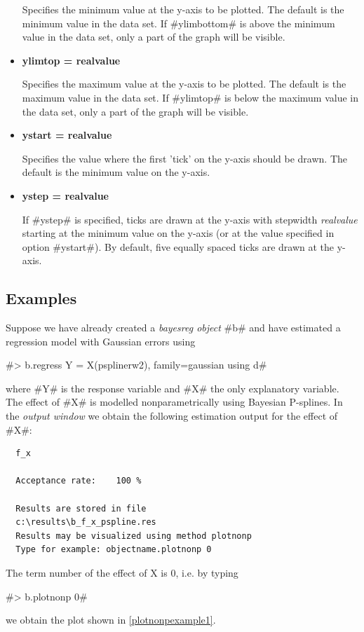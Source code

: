 \begin{itemize}
Specifies the minimum value at the y-axis to be plotted. The
default is the minimum value in the data set. If #ylimbottom# is
above the minimum value in the data set, only a part of the graph
will be visible.
\item {\bf ylimtop = realvalue}

Specifies the maximum value at the y-axis to be plotted. The
default is the maximum value in the data set. If #ylimtop# is
below the maximum value in the data set, only a part of the graph
will be visible.
\item {\bf ystart = realvalue}

Specifies the value where the first 'tick' on the y-axis should be
drawn. The default is the minimum value on the y-axis.
\item {\bf ystep = realvalue}

If #ystep# is specified,  ticks are drawn at the y-axis with
stepwidth {\em realvalue} starting at the minimum value on the
y-axis (or at the value specified in option #ystart#). By default,
five equally spaced ticks are drawn at the y-axis.
\end{itemize}


\subsection*{Examples}

Suppose we have already created a {\em bayesreg object} #b# and
have estimated a regression model with Gaussian errors using

#> b.regress Y = X(psplinerw2), family=gaussian using d#

where #Y# is the response variable and #X# the only explanatory
variable. The effect of #X# is modelled nonparametrically using
Bayesian P-splines. In the {\em output window} we obtain the
following estimation output for the effect of #X#:

\begin{verbatim}
  f_x

  Acceptance rate:    100 %

  Results are stored in file
  c:\results\b_f_x_pspline.res
  Results may be visualized using method plotnonp
  Type for example: objectname.plotnonp 0
\end{verbatim}

The term number of the effect of X is 0, i.e. by typing

#> b.plotnonp 0#

we obtain the plot shown in \autoref{plotnonpexample1}.


